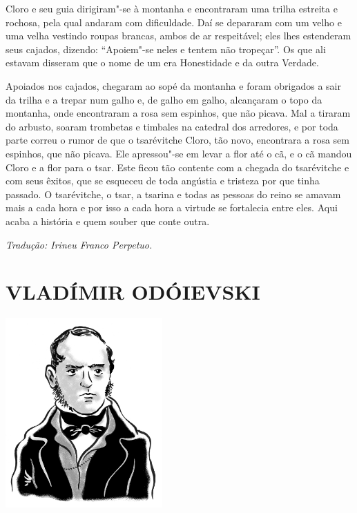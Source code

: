 Cloro e seu guia dirigiram"-se à montanha e encontraram uma trilha
estreita e rochosa, pela qual andaram com dificuldade. Daí se depararam
com um velho e uma velha vestindo roupas brancas, ambos de ar
respeitável; eles lhes estenderam seus cajados, dizendo: ``Apoiem"-se
neles e tentem não tropeçar''. Os que ali estavam disseram que o nome de
um era Honestidade e da outra Verdade.

Apoiados nos cajados, chegaram ao sopé da montanha e foram obrigados a
sair da trilha e a trepar num galho e, de galho em galho, alcançaram o
topo da montanha, onde encontraram a rosa sem espinhos, que não picava.
Mal a tiraram do arbusto, soaram trombetas e timbales na catedral dos
arredores, e por toda parte correu o rumor de que o tsarévitche Cloro,
tão novo, encontrara a rosa sem espinhos, que não picava. Ele apressou"-se
em levar a flor até o cã, e o cã mandou Cloro e a flor para o tsar. Este
ficou tão contente com a chegada do tsarévitche e com seus êxitos, que
se esqueceu de toda angústia e tristeza por que tinha passado. O
tsarévitche, o tsar, a tsarina e todas as pessoas do reino se amavam
mais a cada hora e por isso a cada hora a virtude se fortalecia entre eles. Aqui
acaba a história e quem souber que conte outra.\enlargethispage{\baselineskip}


{\footnotesize\hfill\emph{Tradução: Irineu Franco Perpetuo.}}

\part[VLADÍMIR ODÓIEVSKI]{VLADÍMIR ODÓIEVSKI }

\pagebreak
\thispagestyle{empty}
\mbox{}
\vfill
\begin{center}
\includegraphics[width=6cm]{./imgs/autor2.jpg}
\end{center}


